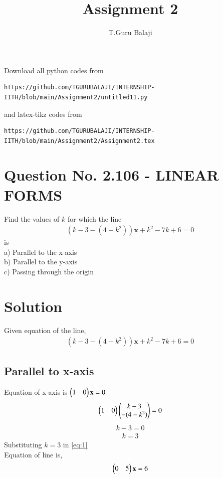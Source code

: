 \documentclass[journal,12pt,twocolumn]{IEEEtran}
\begin{document}
\makeatletter
{}
\makeatother
\let\StandardTheFigure\thefigure
\let\vec\mathbf
\renewcommand{\thefigure}{\theproblem}
\def\putbox#1#2#3{\makebox[0in][l]{\makebox[#1][l]{}\raisebox{\baselineskip}[0in][0in]{\raisebox{#2}[0in][0in]{#3}}}}
     \def\rightbox#1{\makebox[0in][r]{#1}}
     \def\centbox#1{\makebox[0in]{#1}}
     \def\topbox#1{\raisebox{-\baselineskip}[0in][0in]{#1}}
     \def\midbox#1{\raisebox{-0.5\baselineskip}[0in][0in]{#1}}
\vspace{3cm}
\title{Assignment 2}
\author{T.Guru Balaji}
\maketitle
\newpage
\bigskip
\renewcommand{\thefigure}{\theenumi}
\renewcommand{\thetable}{\theenumi}
Download all python codes from 
\begin{lstlisting}
https://github.com/TGURUBALAJI/INTERNSHIP-IITH/blob/main/Assignment2/untitled11.py
\end{lstlisting}
%
and latex-tikz codes from 
%
\begin{lstlisting}
https://github.com/TGURUBALAJI/INTERNSHIP-IITH/blob/main/Assignment2/Assignment2.tex
\end{lstlisting}
\section{\textbf{Question No. 2.106 - LINEAR FORMS}}
Find the values of $k$ for which the line\\
\begin{align}
(k-3-(4-k^2))\vec{x}+k^2-7k+6=0
\end{align}
is\\
a) Parallel to the x-axis\\
b) Parallel to the y-axis\\
c) Passing through the origin\\
%
\section{\textbf {Solution}}
Given equation of the line, 
\begin{align}
(k-3-(4-k^2))\vec{x}+k^2-7k+6=0\label{eq:1}
\end{align}
\subsection{ Parallel to x-axis}
Equation of x-axis is $\myvec{1 & 0}\vec{x}=0$\\
\begin{align}
  \begin{pmatrix}1 & 0\end{pmatrix}\begin{pmatrix}k-3\\-(4-k^2)\end{pmatrix} =0
\end{align}
\begin{align}
   k-3=0
\end{align}
\begin{align}
    k=3
\end{align}
Substituting $k=3$ in \eqref{eq:1}\\
Equation of line is,
\begin{align}
     \myvec{0 & 5}\vec{x}=6
\end{align}
 
\end{document}
